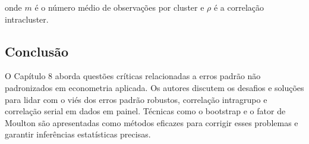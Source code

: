 \documentclass[a4paper,12pt]{article}[abntex2]
\begin{document}
onde \( m \) é o número médio de observações por cluster e \( \rho \) é a correlação intracluster.

\subsection{Conclusão}
O Capítulo 8 aborda questões críticas relacionadas a erros padrão não padronizados em econometria aplicada. Os autores discutem os desafios e soluções para lidar com o viés dos erros padrão robustos, correlação intragrupo e correlação serial em dados em painel. Técnicas como o bootstrap e o fator de Moulton são apresentadas como métodos eficazes para corrigir esses problemas e garantir inferências estatísticas precisas.
\end{document}
